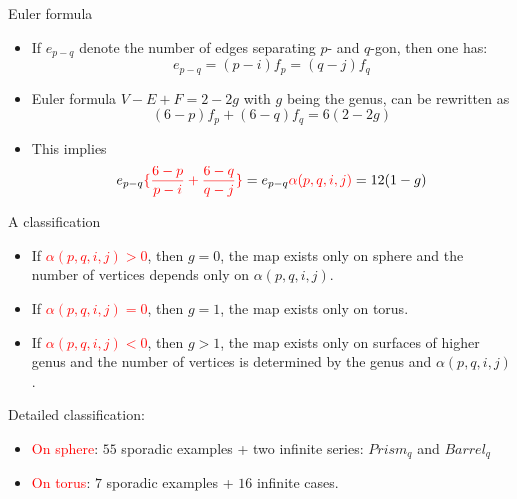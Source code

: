 \documentclass[%
pdf,
colorBG,
slideColor,
]{prosper}
\begin{document}
\begin{slide}{Euler formula}
\begin{itemize}
\item If $e_{p-q}$ denote the number of edges 
separating $p$- and $q$-gon, then one has:
\begin{equation*}
e_{p-q}=(p-i)f_p=(q-j)f_q
\end{equation*}
\item Euler formula $V-E+F=2-2g$ with $g$ being the genus,
can be rewritten as
\begin{equation*}
(6-p)f_p+(6-q)f_q=6(2-2g)
\end{equation*}
\item This implies
\begin{equation*}
e_{p-q}\textcolor{red}{\{\frac{6-p}{p-i}+\frac{6-q}{q-j}\} }=e_{p-q}\textcolor{red}{\alpha(p,q,i,j)}=12(1-g)
\end{equation*}
\end{itemize}


\end{slide}








\begin{slide}{A classification}
\vspace{-3mm}
\begin{itemize}
\item If \textcolor{red}{$\alpha(p,q,i,j)>0$}, then $g=0$, the map exists only on sphere and the number of vertices depends only on $\alpha(p,q,i,j)$.
\item If \textcolor{red}{$\alpha(p,q,i,j)=0$}, then $g=1$, the map exists only on torus.
\item If \textcolor{red}{$\alpha(p,q,i,j)<0$}, then $g>1$, the map exists only on surfaces of higher genus and the number of vertices is determined by the genus and $\alpha(p,q,i,j)$.
\end{itemize}
Detailed classification:
\begin{itemize}
\item \textcolor{red}{On sphere}: $55$ sporadic examples + two infinite series: $Prism_q$ and $Barrel_q$
\item \textcolor{red}{On torus}: $7$ sporadic examples + $16$ infinite cases.
\end{itemize}


\end{slide}
\end{document}
